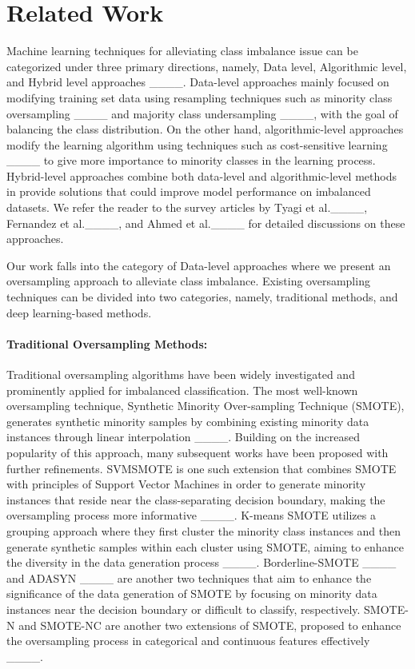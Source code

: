 \section{Related Work}
\label{sec:related}

Machine learning techniques for alleviating class imbalance issue can be categorized under three primary directions, namely, Data level, Algorithmic level, and Hybrid level approaches ____. Data-level approaches mainly focused on modifying training set data using resampling techniques such as minority class oversampling ____ and majority class undersampling ____, with the goal of balancing the class distribution. On the other hand, algorithmic-level approaches modify the learning algorithm using techniques such as cost-sensitive learning ____ to give more importance to minority classes in the learning process. Hybrid-level approaches combine both data-level and algorithmic-level methods in provide solutions that could improve model performance on imbalanced datasets. We refer the reader to the survey articles by Tyagi et al.____, Fernandez et al.____, and Ahmed et al.____ for detailed discussions on these approaches.

Our work falls into the category of Data-level approaches where we present an oversampling approach to alleviate class imbalance. Existing oversampling techniques can be divided into two categories, namely, traditional methods, and deep learning-based methods.

\paragraph{\textbf{Traditional Oversampling Methods: }} Traditional oversampling algorithms have been widely investigated and prominently applied for imbalanced classification. The most well-known oversampling technique, Synthetic Minority Over-sampling Technique (SMOTE), generates synthetic minority samples by combining existing minority data instances through linear interpolation ____. Building on the increased popularity of this approach, many subsequent works have been proposed with further refinements. SVMSMOTE is one such extension that combines SMOTE with principles of Support Vector Machines in order to generate minority instances that reside near the class-separating decision boundary, making the oversampling process more informative ____. K-means SMOTE utilizes a grouping approach where they first cluster the minority class instances and then generate synthetic samples within each cluster using SMOTE, aiming to enhance the diversity in the data generation process ____. Borderline-SMOTE ____ and ADASYN ____ are another two techniques that aim to enhance the significance of the data generation of SMOTE by focusing on minority data instances near the decision boundary or difficult to classify, respectively. SMOTE-N and SMOTE-NC are another two extensions of SMOTE, proposed to enhance the oversampling process in categorical and continuous features effectively ____.

